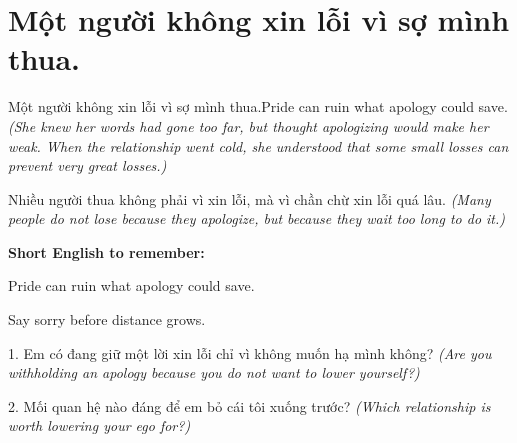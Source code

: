 \section{Một người không xin lỗi vì sợ mình thua.}
\begin{truyen}{Một người không xin lỗi vì sợ mình thua.}{Pride can ruin what apology could save.}
\textit{(She knew her words had gone too far, but thought apologizing would make her weak. When the relationship went cold, she understood that some small losses can prevent very great losses.)}
\end{truyen}
\begin{baihoc}
Nhiều người thua không phải vì xin lỗi, mà vì chần chừ xin lỗi quá lâu.
\textit{(Many people do not lose because they apologize, but because they wait too long to do it.)}
\end{baihoc}
\begin{ghinhoanh}
\textbf{Short English to remember:}

Pride can ruin what apology could save.

Say sorry before distance grows.
\end{ghinhoanh}
\begin{tuhocnhanh}
1. Em có đang giữ một lời xin lỗi chỉ vì không muốn hạ mình không? \textit{(Are you withholding an apology because you do not want to lower yourself?)}

2. Mối quan hệ nào đáng để em bỏ cái tôi xuống trước? \textit{(Which relationship is worth lowering your ego for?)}
\end{tuhocnhanh}
\ngancach

